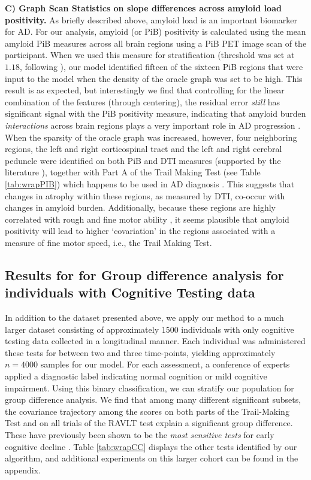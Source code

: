 {\bf C) Graph Scan Statistics on slope differences across amyloid load positivity.} 
As briefly described above, amyloid load is an important biomarker for AD. For our analysis, amyloid (or PiB) positivity 
is calculated using the mean amyloid PiB measures across all brain regions using a PiB PET image scan of the participant. 
When we used this measure for stratification (threshold was set at $1.18$, following \cite{darst2017pathway}), 
our model identified fifteen of the sixteen PiB regions that were input to the model when the density of the oracle graph was set to be high. 
This result is as expected, but interestingly we find that controlling for the linear combination of the features (through centering), 
the residual error \textit{still} has significant signal with the PiB positivity measure, indicating that amyloid burden \textit{interactions} 
across brain regions plays a very important role in AD progression \cite{hardy2002amyloid,hardy1992alzheimer,tanzi2005twenty,jack2010brain}. When the sparsity of the oracle graph was increased, however, four neighboring regions, the left and right corticospinal tract and the left and right cerebral peduncle were identified on both PiB and DTI measures (supported by the literature \cite{douaud2011dti}), together with Part A of the Trail Making Test (see Table \ref{tab:wrapPIB}) which 
happens to be used in AD diagnosis \cite{albert2011diagnosis}. 
This suggests that changes in atrophy within these regions, as measured by DTI, co-occur with changes in amyloid burden. Additionally, because these regions are highly correlated with rough and fine motor ability \cite{naidich2009duvernoy}, it seems plausible that amyloid positivity will lead to higher `covariation' in the regions associated with 
a measure of fine motor speed, i.e., the Trail Making Test.

\subsection{Results for for Group difference analysis for individuals with Cognitive Testing data}

In addition to the dataset presented above, we apply our method to a much larger dataset consisting of approximately 1500 individuals with only cognitive testing data collected in a longitudinal manner. Each individual was administered these tests for between two and three time-points, yielding approximately $n = 4000$ samples for our model. For each assessment, a conference of experts applied a diagnostic label indicating normal cognition or mild cognitive impairment. Using this binary classification, we can stratify our population for group difference analysis.
We find that among many different significant subsets, the covariance trajectory among the scores on both parts of the Trail-Making Test and 
on all trials of the RAVLT test explain a significant group difference. These have previously been shown to be the {\em most sensitive tests} for 
early cognitive decline \cite{albert2001preclinical}. 
Table \ref{tab:wrapCC} displays the other tests identified by our algorithm, and additional experiments on this larger cohort 
can be found in the appendix. 
%

